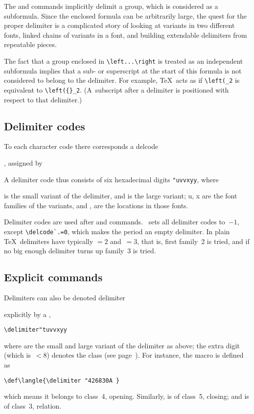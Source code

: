 The  and  commands
implicitly delimit a group, which is considered as a subformula.
Since the enclosed formula can
be arbitrarily large, the quest for the proper delimiter is
a complicated story of looking at variants in two different
fonts, linked chains of variants in a font, and building
extendable delimiters from repeatable pieces.

The fact that a group enclosed in \verb>\left...\right> is
treated as an independent subformula implies that a
sub- or superscript at the start of this formula is
not considered to belong to the delimiter. 
For example, \TeX\ acts as if 
\verb>\left(_2> is equivalent to \verb>\left({}_2>.
(A~subscript after a  delimiter is positioned
with respect to that delimiter.)

\subsection{Delimiter codes }
\label{delcodes}

To each character code there corresponds a 
\cstoidx delcode\par{},
assigned by
\begin{disp}%
          \end{disp}
A delimiter code thus consists of six hexadecimal digits
\verb-"uvvxyy-, where
\begin{disp}
 is the small variant of the delimiter, and\nl
{} is the large variant;\nl
\n u, \n x are the font families of the variants, and\nl
{},  are the locations in those fonts.\end{disp}
Delimiter codes are used after  and 
commands.
\IniTeX\ sets all delimiter codes to~$-1$,
except\label{ini:del}
\verb-\delcode`.=0-, which makes the period an empty delimiter.
In plain \TeX\ delimiters have typically ${}=2$ and~${}=3$,
that is, first family~2 is tried, and if no big
enough delimiter turns up family~3 is tried.


\subsection{Explicit  commands}

Delimiters can also be denoted 
\cstoidx delimiter\par
explicitly by a ,
\begin{verbatim}
\delimiter"tuvvxyy
\end{verbatim}
where  are the small and large variant of the
delimiter as above;
the extra digit  (which is~$<8$) denotes the class
(see page~\pageref{math:class}).
For instance, the  macro is defined as
\begin{verbatim}
\def\langle{\delimiter "426830A }
\end{verbatim}
which means it belongs to class~4, opening. Similarly,
 is of class~5, closing; and  is of class~3,
relation.

